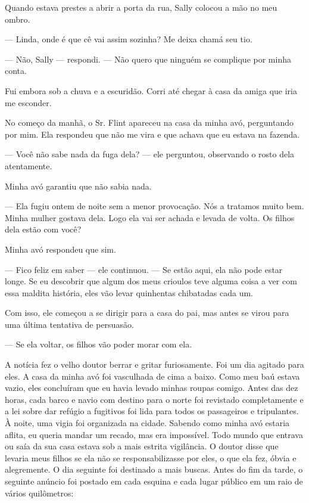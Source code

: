 Quando estava prestes a abrir a porta
da rua, Sally colocou a mão no meu ombro.

--- Linda, onde é que cê vai assim sozinha? Me deixa chamá seu tio.

--- Não, Sally --- respondi. --- Não
quero que ninguém se complique por minha conta.

Fui embora sob a chuva e a escuridão.
Corri até chegar à casa da amiga que iria me esconder.

No começo da manhã, o Sr. Flint
apareceu na casa da minha avó, perguntando por mim. Ela respondeu que
não me vira e que achava que eu estava na fazenda.

--- Você não sabe nada da fuga dela? --- ele perguntou, observando o
rosto dela atentamente.

Minha avó garantiu que não sabia nada.

--- Ela fugiu ontem de noite sem a menor provocação. Nós a tratamos
muito bem. Minha mulher gostava dela. Logo ela vai ser achada e levada
de volta. Os filhos dela estão com você?

Minha avó respondeu que sim.

--- Fico feliz em saber --- ele continuou. --- Se estão aqui, ela não
pode estar longe. Se eu descobrir que algum dos meus crioulos teve
alguma coisa a ver com essa maldita história, eles vão levar quinhentas
chibatadas cada um.

Com isso, ele começou a se dirigir para a casa do pai, mas antes se
virou para uma última tentativa de persuasão.

--- Se ela voltar, os filhos vão poder morar com ela.

A notícia fez o velho doutor berrar e
gritar furiosamente. Foi um dia agitado para eles. A casa da minha avó
foi vasculhada de cima a baixo. Como meu baú estava vazio, eles
concluíram que eu havia levado minhas roupas comigo. Antes das dez
horas, cada barco e navio com destino para o norte foi revistado
completamente e a lei sobre dar refúgio a fugitivos foi lida para todos
os passageiros e tripulantes. À noite, uma vigia foi organizada na
cidade. Sabendo como minha avó estaria aflita, eu queria mandar um
recado, mas era impossível. Todo mundo que entrava ou saía da sua casa
estava sob a mais estrita vigilância. O doutor disse que levaria meus
filhos se ela não se responsabilizasse por eles, o que ela fez, óbvia e
alegremente. O dia seguinte foi destinado a mais buscas. Antes do fim da
tarde, o seguinte anúncio foi postado em cada esquina e cada lugar
público em um raio de vários quilômetros:

